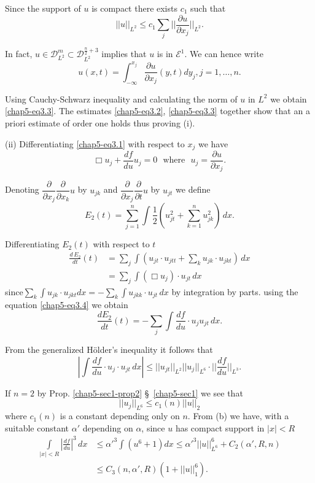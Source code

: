 Since the support of $u$ is compact there exists $c_1$ such that  
\begin{equation*}
|| u ||_{L^2}\leq c_1 \sum\limits_{j} || \frac{\partial u}{\partial
  x_j}||_{L^2}. \tag{3.3}\label{chap5-eq3.3}  
\end{equation*}

In fact, $u \in \mathscr{D}^m_{L^2} \subset
\mathscr{D}^{\frac{n}{2}+3}_{L^2}$ implies that $u$ is in
$\mathscr{E}^1$. We can hence write  
$$
u(x, t) = \int^{x_j}_{- \infty} \frac{\partial u}{\partial x_j} (y, t)
dy_j, j = 1, \ldots, n.   
$$

Using Cauchy-Schwarz inequality and calculating the norm of $u$ in
$L^2$ we obtain \eqref{chap5-eq3.3}. The estimates
\eqref{chap5-eq3.2}, \eqref{chap5-eq3.3} together show that 
an a priori estimate of order one holds thus proving (i).  

\noindent
(ii) Differentiating \eqref{chap5-eq3.1} with respect to $x_j$ we have 
\begin{equation*}
\Box  u_j + \frac{df}{du} u_j = 0 \text{~ where~ }  u_j = \frac{\partial
  u}{\partial x_j}.  \tag{3.4}\label{chap5-eq3.4}
\end{equation*}

Denoting $\dfrac{\partial}{\partial x_j} \dfrac{\partial }{\partial
  x_k} u$ by $u_{jk}$ and $\dfrac{\partial }{\partial
  x_j}\dfrac{\partial }{\partial t} u$ by $u_{jt}$ we define  
$$
E_2 (t) = \sum_{j=1}^{n} \int \frac{1}{2} \left(u^2_{jt} + \sum^n_{k=1} 
u^2_{jk}\right) \, dx.  
$$

Differentiating $E_2 (t)$ with respect to $t$ 	 
\begin{align*}
\frac{d \, E_2}{dt} (t) & = \sum_j \int \left(u_{jt} \cdot u_{jtt} + \sum_k
u_{jk} \cdot u_{jkt}\right) \, dx \\ 
& = \sum_j \int (\Box u_j ) \cdot u_{jt} \, dx 
\end{align*}
since\pageoriginale $\sum\limits_k \int u_{jk}\cdot u_{jkt} dx = -
\sum\limits_k \int u_{jkk} \cdot u_{jt} \, dx$ by integration by
parts. using the equation \eqref{chap5-eq3.4} we obtain   
$$
\frac{d E_2}{dt} (t) = - \sum_j \int \frac{df}{du} \cdot u_j u_{jt} \,
dx.   
$$

From the generalized H\"older's inequality it follows that  
$$
| \int \frac{df}{du} \cdot  u_j \cdot u_{jt}\,dx | \leq || u_{jt}
||_{L^2} || u_j ||_{L^6} \cdot || \frac{df}{du}||_{L^3}.  
$$

If $n = 2$ by Prop. \ref{chap5-sec1-prop2} \S\ \ref{chap5-sec1} we see that 
$$
|| u_j ||_{L^6} \leq c_1 (n) || u ||_2  
$$
where $c_1(n)$ is a constant depending only on $n$. From (b) we
have, with a suitable constant $\alpha'$ depending on $\alpha$, since
$u$ has compact support in $|x| < R$ 
\begin{align*}
\int\limits_{|x|<R} |\frac{df}{du}|^3 \, dx & \leq \alpha'^{3} \int
(u^6 + 1) dx \leq \alpha'^3 ||u||^6_{L^6} + C_2(\alpha', R, n) \\ 
& \leq C_3 (n, \alpha', R) (1 + || u ||^6_1). 
\end{align*}

